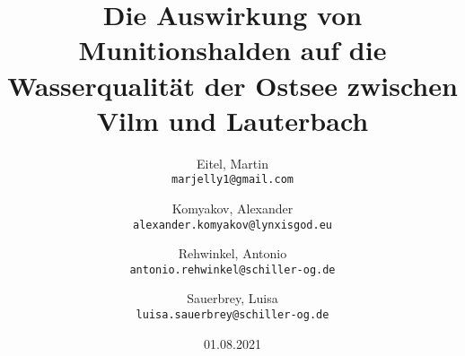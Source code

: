 \documentclass[12pt,titlepage]{scrreprt}
\begin{document}
\begin{titlepage}
\title{Die Auswirkung von Munitionshalden auf die Wasserqualität der Ostsee zwischen Vilm und Lauterbach}
\date{01.08.2021}
\author{Eitel, Martin \\ \texttt{marjelly1@gmail.com}\and Komyakov, Alexander \\\texttt{alexander.komyakov@lynxisgod.eu} \\ \and Rehwinkel, Antonio \\ \texttt{antonio.rehwinkel@schiller-og.de} \\ \and Sauerbrey, Luisa \\ \texttt{luisa.sauerbrey@schiller-og.de}}
\maketitle
\end{titlepage}
\tableofcontents



{}

\end{document}
